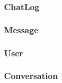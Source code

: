 \documentclass[a4paper,11pt]{article}
\begin{document}
		\subsubsection{ChatLog}
			
			\subsubsection{Message}
			
			\subsubsection{User}
			
			\subsubsection{Conversation}
			








	
\end{document}
